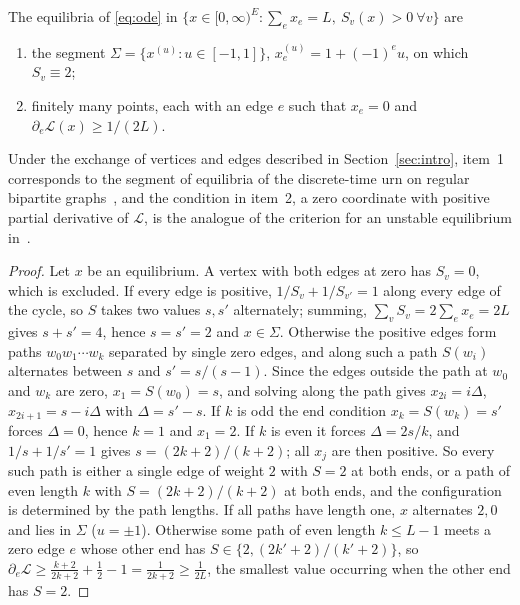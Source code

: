 \documentclass[11pt]{amsart}
\theoremstyle{remark}\newtheorem{remark}[theorem]{Remark}
\begin{document}
\begin{lemma}\label{lem:eq}
The equilibria of \eqref{eq:ode} in $\{x\in[0,\infty)^E:\sum_e x_e=L,\ S_v(x)>0\ \forall v\}$ are
\begin{enumerate}
\item the segment $\Sigma=\{x^{(u)}:u\in[-1,1]\}$, $x^{(u)}_e=1+(-1)^eu$, on which $S_v\equiv2$;
\item finitely many points, each with an edge $e$ such that $x_e=0$ and $\partial_e\mathcal{L}(x)\ge 1/(2L)$.
\end{enumerate}
\end{lemma}
Under the exchange of vertices and edges described in Section~\ref{sec:intro}, item~1 corresponds to the segment of
equilibria of the discrete-time urn on regular bipartite graphs~\cite[(1.3)]{CL}, and the condition in item~2, a zero
coordinate with positive partial derivative of $\mathcal{L}$, is the analogue of the criterion for an unstable
equilibrium in~\cite[Lemma~2.7]{CL}.
\begin{proof}
Let $x$ be an equilibrium. A vertex with both edges at zero has $S_v=0$, which is excluded. If every edge is positive,
$1/S_v+1/S_{v'}=1$ along every edge of the cycle, so $S$ takes two values $s,s'$ alternately; summing,
$\sum_v S_v=2\sum_e x_e=2L$ gives $s+s'=4$, hence $s=s'=2$ and $x\in\Sigma$. Otherwise the positive edges form paths
$w_0w_1\cdots w_k$ separated by single zero edges, and along such a path $S(w_i)$ alternates between $s$ and
$s'=s/(s-1)$. Since the edges outside the path at $w_0$ and $w_k$ are zero, $x_1=S(w_0)=s$, and solving along the path
gives $x_{2i}=i\Delta$, $x_{2i+1}=s-i\Delta$ with $\Delta=s'-s$. If $k$ is odd the end condition $x_k=S(w_k)=s'$ forces $\Delta=0$, hence
$k=1$ and $x_1=2$. If $k$ is even it forces $\Delta=2s/k$, and $1/s+1/s'=1$ gives $s=(2k+2)/(k+2)$; all $x_j$ are then
positive. So every such path is either a single edge of weight $2$ with $S=2$ at both ends, or a path of even length $k$
with $S=(2k+2)/(k+2)$ at both ends, and the configuration is determined by the path lengths. If all paths have length
one, $x$ alternates $2,0$ and lies in $\Sigma$ ($u=\pm1$). Otherwise some path of even length $k\le L-1$ meets a zero edge
$e$ whose other end has $S\in\{2,(2k'+2)/(k'+2)\}$, so
$\partial_e\mathcal{L}\ge \frac{k+2}{2k+2}+\frac12-1=\frac{1}{2k+2}\ge\frac1{2L}$, the smallest value occurring when
the other end has $S=2$.
\end{proof}
\end{document}
